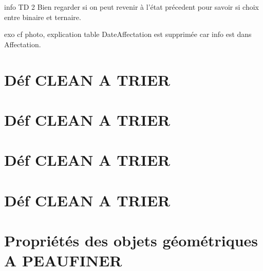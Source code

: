 \documentclass[12pt,a4paper]{article}
\begin{document}
{info TD 2
Bien regarder si on peut revenir à l'état précedent pour savoir si choix entre binaire et ternaire.


exo
cf photo, explication table DateAffectation est supprimée car info est dans Affectation.





\section{Déf CLEAN A TRIER }
\section{Déf CLEAN A TRIER }
\section{Déf CLEAN A TRIER }
\section{Déf CLEAN A TRIER }




\section{Propriétés des objets géométriques A PEAUFINER}







}
\end{document}
